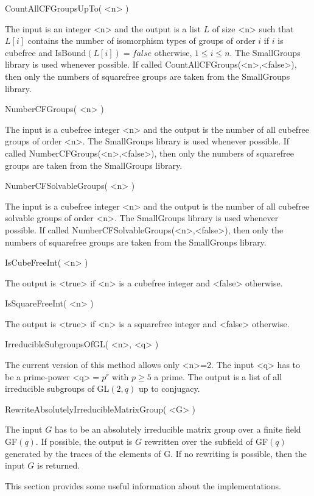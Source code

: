 \>CountAllCFGroupsUpTo( <n> )

The input is an integer <n> and the output is a list $L$ of size <n> such that
$L[i]$ contains the number of isomorphism types of groups of order $i$ if $i$
is cubefree and IsBound$(L[i])=false$ otherwise, $1\leq i \leq n$. The SmallGroups library is used whenever
possible. If called CountAllCFGroups(<n>,<false>), then only the numbers of
squarefree groups are taken from the SmallGroups library.

\>NumberCFGroups( <n> )

The input is a cubefree integer <n> and the output is the number of all
cubefree groups of order <n>. The SmallGroups library is used whenever
possible. If called NumberCFGroups(<n>,<false>), then only the numbers of
squarefree groups are taken from the SmallGroups library.


\>NumberCFSolvableGroups( <n> )

The input is a cubefree integer <n> and the output is the number of all
cubefree solvable groups of order <n>. The SmallGroups library is used whenever
possible. If called NumberCFSolvableGroups(<n>,<false>), then only the numbers of
squarefree groups are taken from the SmallGroups library.

\>IsCubeFreeInt( <n> )

The output is <true> if <n> is a cubefree integer and <false> otherwise.


\>IsSquareFreeInt( <n> )

The output is <true> if <n> is a squarefree integer and <false> otherwise.

\>IrreducibleSubgroupsOfGL( <n>, <q> )

The current version of this method allows only <n>=2. The input <q> has to be a prime-power <q>$=p^r$ with $p\geq 5$ a prime. The output
is a list of all irreducible subgroups of GL$(2,q)$ up to
conjugacy.

\>RewriteAbsolutelyIrreducibleMatrixGroup( <G> )

The input $G$ has to be an absolutely irreducible matrix group over a finite
field GF$(q)$. If possible, the output is
$G$ rewritten over the subfield of GF$(q)$ generated by the traces of the
elements of G. If no rewriting is possible, then the
input $G$ is returned. 



This section provides some useful information about the implementations.


